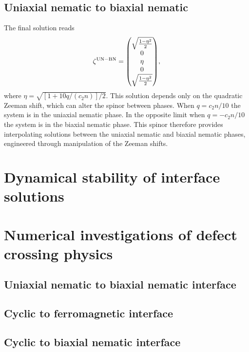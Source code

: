 \subsection{Uniaxial nematic to biaxial nematic}


The final solution reads
\begin{equation}
    \zeta^\mathrm{UN-BN} = \mqty(\sqrt{\frac{1 - \eta^2}{2}} \\ 0 \\ \eta \\ 0 \\
    \sqrt{\frac{1 - \eta^2}{2}}),
\end{equation}
where \(\eta = \sqrt{[1 + 10q/(c_2n)]/2}\).
This solution depends only on the quadratic Zeeman shift, which can alter the
spinor between phases.
When \(q = c_2n / 10\) the system is in the uniaxial nematic phase.
In the opposite limit when \(q = -c_2n/10\) the system is in the biaxial
nematic phase.
This spinor therefore provides interpolating solutions between the uniaxial
nematic and biaxial nematic phases, engineered through manipulation of the
Zeeman shifts.

\section{Dynamical stability of interface solutions}

\section{Numerical investigations of defect crossing physics}
\subsection{Uniaxial nematic to biaxial nematic interface}
\subsection{Cyclic to ferromagnetic interface}
\subsection{Cyclic to biaxial nematic interface}
